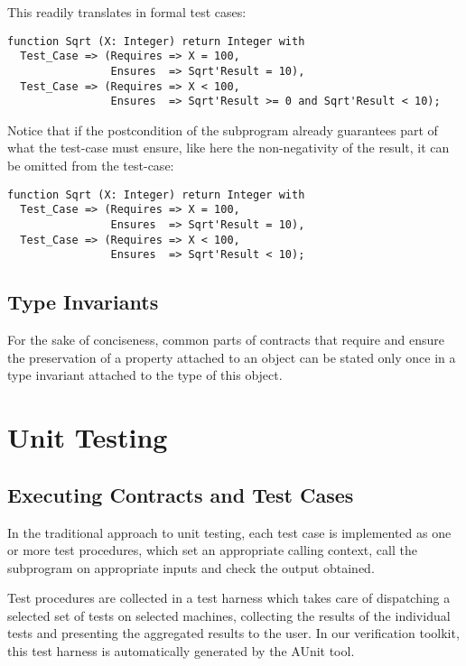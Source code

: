 \documentclass{article}
\begin{document}
This readily translates in formal test cases:

\begin{verbatim}
function Sqrt (X: Integer) return Integer with
  Test_Case => (Requires => X = 100, 
                Ensures  => Sqrt'Result = 10),
  Test_Case => (Requires => X < 100, 
                Ensures  => Sqrt'Result >= 0 and Sqrt'Result < 10);
\end{verbatim}

Notice that if the postcondition of the subprogram already guarantees part of
what the test-case must ensure, like here the non-negativity of the result, it
can be omitted from the test-case:

\begin{verbatim}
function Sqrt (X: Integer) return Integer with
  Test_Case => (Requires => X = 100, 
                Ensures  => Sqrt'Result = 10),
  Test_Case => (Requires => X < 100, 
                Ensures  => Sqrt'Result < 10);
\end{verbatim}

\subsection{Type Invariants}

For the sake of conciseness, common parts of contracts that require and ensure
the preservation of a property attached to an object can be stated only once in
a type invariant attached to the type of this object.

\section{Unit Testing}

\subsection{Executing Contracts and Test Cases}

In the traditional approach to unit testing, each test case is implemented as
one or more test procedures, which set an appropriate calling context, call the
subprogram on appropriate inputs and check the output obtained.

Test procedures are collected in a test harness which takes care of dispatching
a selected set of tests on selected machines, collecting the results of the
individual tests and presenting the aggregated results to the user. In our
verification toolkit, this test harness is automatically generated by the AUnit
tool.
\end{document}
